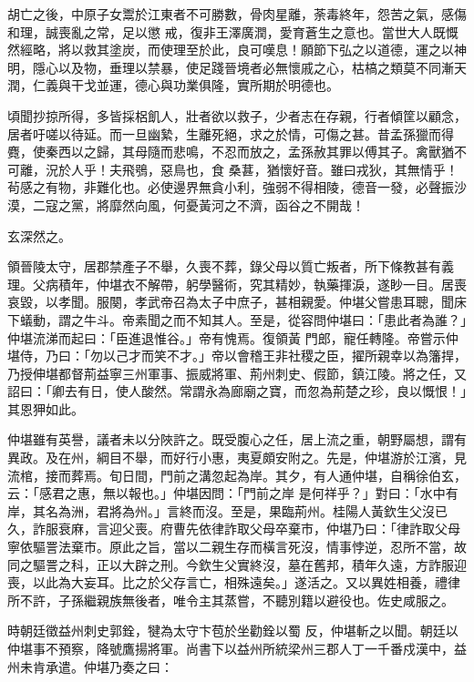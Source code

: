 \begin{pinyinscope}
 胡亡之後，中原子女鬻於江東者不可勝數，骨肉星離，荼毒終年，怨苦之氣，感傷和理，誠喪亂之常，足以懲
 戒，復非王澤廣潤，愛育蒼生之意也。當世大人既慨然經略，將以救其塗炭，而使理至於此，良可嘆息！願節下弘之以道德，運之以神明，隱心以及物，垂理以禁暴，使足踐晉境者必無懷戚之心，枯槁之類莫不同漸天潤，仁義與干戈並運，德心與功業俱隆，實所期於明德也。



 頃聞抄掠所得，多皆採梠飢人，壯者欲以救子，少者志在存親，行者傾筐以顧念，居者吁嗟以待延。而一旦幽縶，生離死絕，求之於情，可傷之甚。昔孟孫獵而得麑，使秦西以之歸，其母隨而悲鳴，不忍而放之，孟孫赦其罪以傅其子。禽獸猶不可離，況於人乎！夫飛鴞，惡鳥也，食
 桑葚，猶懷好音。雖曰戎狄，其無情乎！茍感之有物，非難化也。必使邊界無貪小利，強弱不得相陵，德音一發，必聲振沙漠，二寇之黨，將靡然向風，何憂黃河之不濟，函谷之不開哉！



 玄深然之。



 領晉陵太守，居郡禁產子不舉，久喪不葬，錄父母以質亡叛者，所下條教甚有義理。父病積年，仲堪衣不解帶，躬學醫術，究其精妙，執藥揮淚，遂眇一目。居喪哀毀，以孝聞。服闋，孝武帝召為太子中庶子，甚相親愛。仲堪父嘗患耳聰，聞床下蟻動，謂之牛斗。帝素聞之而不知其人。至是，從容問仲堪曰：「患此者為誰？」仲堪流涕而起曰：「臣進退惟谷。」帝有愧焉。復領黃
 門郎，寵任轉隆。帝嘗示仲堪侍，乃曰：「勿以己才而笑不才。」帝以會稽王非社稷之臣，擢所親幸以為籓捍，乃授伸堪都督荊益寧三州軍事、振威將軍、荊州刺史、假節，鎮江陵。將之任，又詔曰：「卿去有日，使人酸然。常謂永為廊廟之寶，而忽為荊楚之珍，良以慨恨！」其恩狎如此。



 仲堪雖有英譽，議者未以分陜許之。既受腹心之任，居上流之重，朝野屬想，謂有異政。及在州，綱目不舉，而好行小惠，夷夏頗安附之。先是，仲堪游於江濱，見流棺，接而葬焉。旬日間，門前之溝忽起為岸。其夕，有人通仲堪，自稱徐伯玄，云：「感君之惠，無以報也。」仲堪因問：「門前之岸
 是何祥乎？」對曰：「水中有岸，其名為洲，君將為州。」言終而沒。至是，果臨荊州。桂陽人黃欽生父沒已久，詐服衰麻，言迎父喪。府曹先依律詐取父母卒棄市，仲堪乃曰：「律詐取父母寧依驅詈法棄市。原此之旨，當以二親生存而橫言死沒，情事悖逆，忍所不當，故同之驅詈之科，正以大辟之刑。今欽生父實終沒，墓在舊邦，積年久遠，方詐服迎喪，以此為大妄耳。比之於父存言亡，相殊遠矣。」遂活之。又以異姓相養，禮律所不許，子孫繼親族無後者，唯令主其蒸嘗，不聽別籍以避役也。佐史咸服之。



 時朝廷徵益州刺史郭銓，犍為太守卞苞於坐勸銓以蜀
 反，仲堪斬之以聞。朝廷以仲堪事不預察，降號鷹揚將軍。尚書下以益州所統梁州三郡人丁一千番戍漢中，益州未肯承遣。仲堪乃奏之曰：




\end{pinyinscope}
